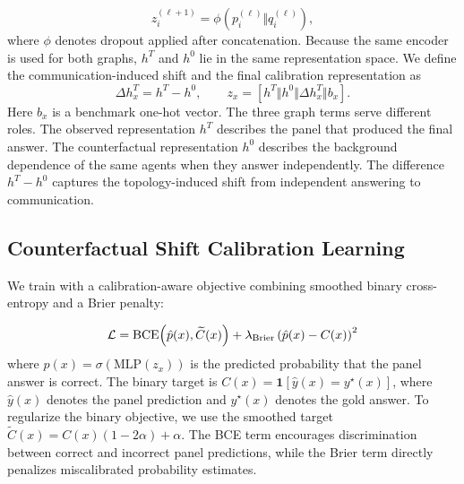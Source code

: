 \begin{equation}
    z_i^{(\ell+1)}
    =
    \phi\left(
    p_i^{(\ell)} \Vert q_i^{(\ell)}
    \right),
\end{equation}
where \(\phi\) denotes dropout applied after concatenation.
Because the same encoder is used for both graphs, \(h^T\) and \(h^0\)
lie in the same representation space. We define the communication-induced shift and the final calibration representation as
\begin{equation}
    \Delta h_x^T = h^T - h^0, 
    \qquad 
    z_x = [h^T \Vert h^0 \Vert \Delta h_x^T \Vert b_x].
\end{equation}
Here \(b_x\) is a benchmark one-hot vector.
The three graph terms serve different roles. 
The observed representation $h^T$ describes the panel that produced the final answer. 
The counterfactual representation $h^0$ describes the background dependence of the same agents when they answer independently. 
The difference $h^T-h^0$ captures the topology-induced shift from independent answering to communication.

\subsection{Counterfactual Shift Calibration Learning}
We train with a calibration-aware objective combining smoothed binary
cross-entropy and a Brier penalty: 

\begin{equation}
\small
\mathcal{L}
=
\mathrm{BCE}\!\left(\hat{p}(x),\widetilde{C}(x)\right)
+
\lambda_{\mathrm{Brier}}
\left(\hat{p}(x)-C(x)\right)^2
\end{equation}
where $\hat{p}(x)=\sigma(\mathrm{MLP}(z_x))$ is the predicted probability that the panel answer is correct.
The binary target is $C(x)=\mathbf{1}[\hat{y}(x)=y^\star(x)]$, where $\hat{y}(x)$ denotes the panel prediction and $y^\star(x)$ denotes the gold answer.
To regularize the binary objective, we use the smoothed target
$\widetilde{C}(x)=C(x)(1-2\alpha)+\alpha$.
The BCE term encourages discrimination between correct and incorrect panel predictions, while the Brier term directly penalizes miscalibrated probability estimates.


